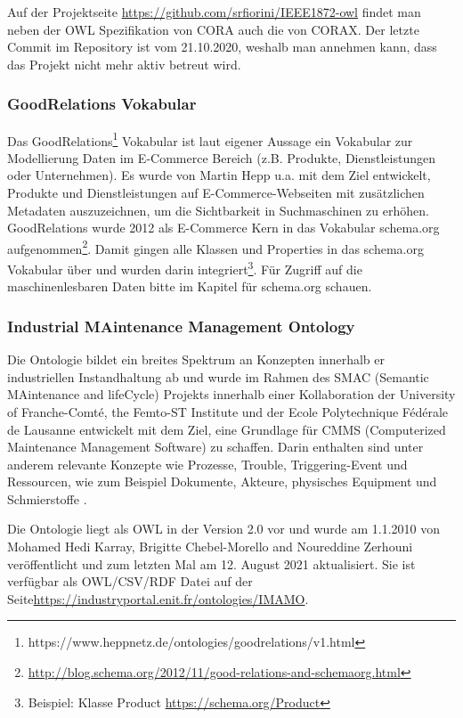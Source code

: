 \documentclass{article}
\begin{document}
Auf der Projektseite \url{https://github.com/srfiorini/IEEE1872-owl} findet man neben der OWL Spezifikation von CORA auch die von CORAX. Der letzte Commit im Repository ist vom 21.10.2020, weshalb man annehmen kann, dass das Projekt nicht mehr aktiv betreut wird.

\subsubsection{GoodRelations Vokabular}

Das GoodRelations\footnote{https://www.heppnetz.de/ontologies/goodrelations/v1.html} Vokabular ist laut eigener Aussage ein Vokabular zur Modellierung Daten im E-Commerce Bereich (z.B. Produkte, Dienstleistungen oder Unternehmen).
Es wurde von Martin Hepp u.a. mit dem Ziel entwickelt, Produkte und Dienstleistungen auf E-Commerce-Webseiten mit zusätzlichen Metadaten auszuzeichnen, um die Sichtbarkeit in Suchmaschinen zu erhöhen.
GoodRelations wurde 2012 als E-Commerce Kern in das Vokabular schema.org aufgenommen\footnote{\url{http://blog.schema.org/2012/11/good-relations-and-schemaorg.html}}.
Damit gingen alle Klassen und Properties in das schema.org Vokabular über und wurden darin integriert\footnote{Beispiel: Klasse Product \url{https://schema.org/Product}}.
Für Zugriff auf die maschinenlesbaren Daten bitte im Kapitel für schema.org schauen.

\subsubsection{Industrial MAintenance Management Ontology}
Die Ontologie bildet ein breites Spektrum an Konzepten innerhalb er industriellen Instandhaltung ab und wurde im Rahmen des SMAC (Semantic MAintenance and lifeCycle) Projekts innerhalb einer Kollaboration der University
of Franche-Comté, the Femto-ST Institute und der Ecole Polytechnique Fédérale de Lausanne entwickelt mit dem Ziel, eine Grundlage für CMMS (Computerized Maintenance Management Software) zu schaffen. Darin enthalten sind unter anderem relevante Konzepte wie Prozesse, Trouble, Triggering-Event und Ressourcen, wie zum Beispiel Dokumente, Akteure, physisches Equipment und Schmierstoffe \cite{karray2012formal}. 

Die Ontologie liegt als OWL in der Version 2.0 vor und wurde am 1.1.2010 von Mohamed Hedi Karray, Brigitte Chebel-Morello and Noureddine Zerhouni veröffentlicht und zum letzten Mal am 12. August 2021 aktualisiert. Sie ist verfügbar als OWL/CSV/RDF Datei auf der Seite\url{https://industryportal.enit.fr/ontologies/IMAMO}.
\end{document}
